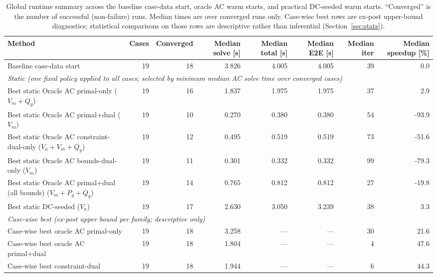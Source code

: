 \begin{table}[!t]
\centering
\caption{Global runtime summary across the baseline case-data start, oracle AC warm starts, and practical DC-seeded warm starts. ``Converged'' is the number of successful (non-failure) runs. Median times are over converged runs only. Case-wise best rows are ex-post upper-bound diagnostics; statistical comparisons on those rows are descriptive rather than inferential (Section~\ref{sec:stats}).}
\label{tab:global_summary}
\small
\setlength{\tabcolsep}{6pt}
\begin{adjustbox}{width=\textwidth}
\begin{tabular}{p{6.2cm}rrrrrrr}
\toprule
Method & Cases & Converged & Median solve [s] & Median total [s] & Median E2E [s] & Median iter & Median speedup [\%] \\
\midrule
Baseline case-data start & 19 & 18 & 3.826 & 4.005 & 4.005 & 39 & 0.0 \\
\midrule
\multicolumn{8}{l}{\textit{Static (one fixed policy applied to all cases; selected by minimum median AC solve time over converged cases)}} \\
Best static Oracle AC primal-only ($V_m{+}Q_g$) & 19 & 16 & 1.837 & 1.975 & 1.975 & 37 & 2.9 \\
Best static Oracle AC primal+dual ($V_m$) & 19 & 10 & 0.270 & 0.380 & 0.380 & 54 & -93.9 \\
Best static Oracle AC constraint-dual-only ($V_a{+}V_m{+}Q_g$) & 19 & 12 & 0.495 & 0.519 & 0.519 & 73 & -51.6 \\
Best static Oracle AC bounds-dual-only ($V_m$) & 19 & 11 & 0.301 & 0.332 & 0.332 & 99 & -79.3 \\
Best static Oracle AC primal+dual (all bounds) ($V_m{+}P_g{+}Q_g$) & 19 & 14 & 0.765 & 0.812 & 0.812 & 27 & -19.8 \\
Best static DC-seeded ($V_a$) & 19 & 17 & 2.630 & 3.050 & 3.239 & 38 & 3.3 \\
\midrule
\multicolumn{8}{l}{\textit{Case-wise best (ex-post upper bound per family; descriptive only)}} \\
Case-wise best oracle AC primal-only & 19 & 18 & 3.258 & ---\rlap{$^\dagger$} & ---\rlap{$^\dagger$} & 30 & 21.6 \\
Case-wise best oracle AC primal+dual & 19 & 18 & 1.804 & ---\rlap{$^\dagger$} & ---\rlap{$^\dagger$} & 4 & 47.6 \\
Case-wise best constraint-dual & 19 & 18 & 1.944 & ---\rlap{$^\dagger$} & ---\rlap{$^\dagger$} & 6 & 44.3 \\

\end{tabular}
\end{adjustbox}
\end{table}
